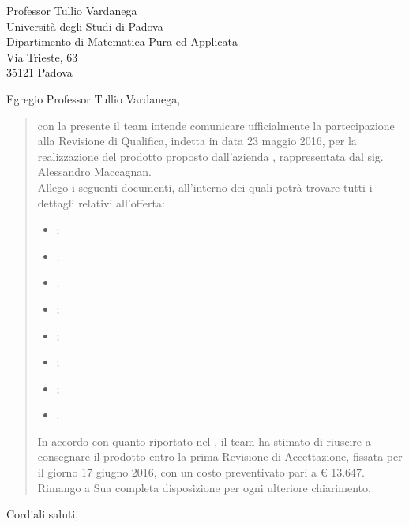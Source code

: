 \date{Padova, 16 Maggio 2016}
\begin{letter}{
	Professor Tullio Vardanega \\
	Università degli Studi di Padova \\
	Dipartimento di Matematica Pura ed Applicata \\
	Via Trieste, 63 \\
	35121 Padova
}
\signature{
\begin{center}
\textit{
\Responsabile{} \\
Responsabile \GroupName{}
}
\texttt{[image: res/MatteoDiPirro.png]}
\end{center}
}
\opening{Egregio Professor Tullio Vardanega,}
\begin{quotation}
con la presente il team \GroupName{} intende comunicare ufficialmente la partecipazione alla Revisione di Qualifica, indetta in data 23 maggio 2016, per la realizzazione del prodotto \ProjectName{} proposto dall'azienda \Proponente, rappresentata dal sig. Alessandro Maccagnan. \\
Allego i seguenti documenti, all'interno dei quali potrà trovare tutti i dettagli relativi all'offerta:
\begin{itemize}
\item \AnalisiDeiRequisiti{};
\item \Glossario{};
\item \NormeDiProgetto{};
\item \PianoDiProgetto{};
\item \PianoDiQualifica{};
\item \SpecificaTecnica{};
\item \DefinizioneDiProdotto{};
\item \ManualeUtente{}.
\end{itemize}
In accordo con quanto riportato nel \PianoDiProgetto, il team ha stimato di riuscire a consegnare il prodotto entro la prima Revisione di Accettazione, fissata per il giorno 17 giugno 2016, con un costo preventivato pari a \euro{} 13.647. \\
Rimango a Sua completa disposizione per ogni ulteriore chiarimento.
\end{quotation}
\closing{Cordiali saluti,}
\end{letter}
